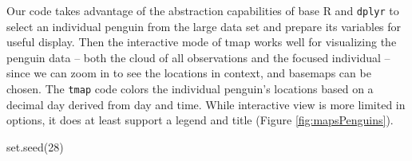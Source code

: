\documentclass[
]{book}
\newenvironment{Shaded}{\begin{snugshade}}{\end{snugshade}}
\newcommand{\AttributeTok}[1]{\textcolor[rgb]{0.61,0.61,0.61}{#1}}
\newcommand{\CommentTok}[1]{\textcolor[rgb]{0.37,0.37,0.37}{\textit{#1}}}
\newcommand{\DecValTok}[1]{\textcolor[rgb]{0.06,0.06,0.06}{#1}}
\newcommand{\FunctionTok}[1]{\textcolor[rgb]{0,0,0}{#1}}
\newcommand{\NormalTok}[1]{#1}
\newcommand{\OtherTok}[1]{\textcolor[rgb]{0.37,0.37,0.37}{#1}}
\newcommand{\SpecialCharTok}[1]{\textcolor[rgb]{0,0,0}{#1}}
\newcommand{\StringTok}[1]{\textcolor[rgb]{0.5,0.5,0.5}{#1}}
\begin{document}
Our code takes advantage of the abstraction capabilities of base R and \texttt{dplyr} to select an individual penguin from the large data set and prepare its variables for useful display. Then the interactive mode of tmap works well for visualizing the penguin data -- both the cloud of all observations and the focused individual -- since we can zoom in to see the locations in context, and basemaps can be chosen. The \texttt{tmap} code colors the individual penguin's locations based on a decimal day derived from day and time. While interactive view is more limited in options, it does at least support a legend and title (Figure \ref{fig:mapsPenguins}).

\begin{Shaded}
\begin{Highlighting}[]
\FunctionTok{set.seed}\NormalTok{(}\DecValTok{28}\NormalTok{)}
\end{Highlighting}
\end{Shaded}

\begin{Shaded}
\end{Shaded}
\end{document}
